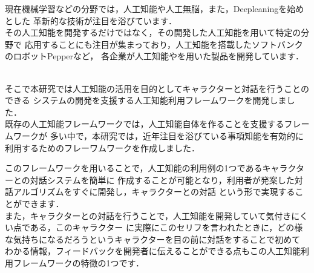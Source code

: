 %

現在機械学習などの分野では，人工知能や人工無脳，また，Deepleaningを始めとした
革新的な技術が注目を浴びています．\\
その人工知能を開発するだけではなく，その開発した人工知能を用いて特定の分野で
応用することにも注目が集まっており，人工知能を搭載したソフトバンクのロボットPepperなど，
各企業が人工知能やを用いた製品を開発しています．

\\
そこで本研究では人工知能の活用を目的としてキャラクターと対話を行うことのできる
システムの開発を支援する人工知能利用フレームワークを開発しました．\\

既存の人工知能フレームワークでは，人工知能自体を作ることを支援するフレームワークが
多い中で，本研究では，近年注目を浴びている事項知能を有効的に利用するためのフレーワムワークを作成しました．

このフレームワークを用いることで，人工知能の利用例の1つであるキャラクターとの対話システムを簡単に
作成することが可能となり，利用者が発案した対話アルゴリズムをすぐに開発し，キャラクターとの対話
という形で実現することができます．\\

また，キャラクターとの対話を行うことで，人工知能を開発していて気付きにくい点である，このキャラクター
に実際にこのセリフを言われたときに，どの様な気持ちになるだろうというキャラクターを目の前に対話をすることで初めて
わかる情報，フィードバックを開発者に伝えることができる点もこの人工知能利用フレームワークの特徴の1つです．